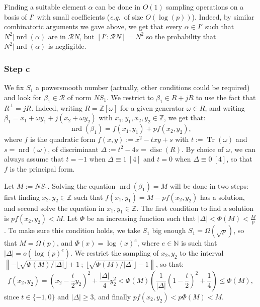 \documentclass[a4paper,10pt,notitlepage]{report}
\theoremstyle{definition}
\theoremstyle{plain}
\theoremstyle{definition}
\newcommand{\eg}{\emph{e.g.}\ }
\newcommand{\N}{\mathbb{N}}
\newcommand{\Z}{\mathbb{Z}}
\newcommand{\m}[1]{\mathcal{#1}}
\renewcommand{\i}[2]{\left\llbracket #1~;~#2\right\rrbracket}
\renewcommand{\(}{\left(}
\renewcommand{\)}{\right)}
\DeclareMathOperator{\Tr}{Tr}
\DeclareMathOperator{\disc}{disc}
\DeclareMathOperator{\nrd}{nrd}
\begin{document}
Finding a suitable element $\alpha$ can be done in $O(1)$ sampling operations on a basis of $I'$ with small coefficients (\eg of size $O(\log(p))$).  Indeed, by similar combinatoric arguments we gave above, we get that every $\alpha\in I'$ such that $N^2|\nrd(\alpha)$ are in $\m{R}N$, but $[I':\m{R}N]=N^2$ so the probability that $N^2|\nrd(\alpha)$ is negligible.

\subsubsection{Step c}

We fix $S_1$ a powersmooth number (actually,  other conditions could be required) and look for $\beta_1\in\m{R}$ of norm $NS_1$. We restrict to $\beta_1\in R+jR$ to use the fact that $R^\bot=jR$.  Indeed, writing $R=\Z[\omega]$ for a given generator $\omega\in R$, and writing $\beta_1=x_1+\omega y_1+j(x_2+\omega y_2)$ with $x_1, y_1, x_2, y_2\in\Z$, we get that:
\[\nrd(\beta_1)=f(x_1,y_1)+pf(x_2,y_2),\]
where $f$ is the quadratic form $f(x,y):=x^2-t xy+s$ with $t:=\Tr(\omega)$ and $s=\nrd(\omega)$, of discriminant $\Delta:=t^2-4s=\disc(R)$.  By choice of $\omega$, we can always assume that $t=-1$ when $\Delta\equiv 1 \ [4]$ and $t=0$ when $\Delta\equiv 0 \ [4]$, so that $f$ is the principal form.  

Let $M:=NS_1$. Solving the equation $\nrd(\beta_1)=M$ will be done in two steps: first finding $x_2,y_2\in\Z$ such that $f(x_1,y_1)=M-pf(x_2,y_2)$ has a solution, and second solve the equation in $x_1,y_1\in\Z$.  The first condition to find a solution is $pf(x_2,y_2)<M$. Let $\Phi$ be an increasing function such that $|\Delta|<\Phi(M)<\frac{M}{p}$. To make sure this condition holds, we take $S_1$ big enough $S_1=\Omega(\sqrt{p})$, so that $M=\Omega(p)$, and $\Phi(x)=\log(x)^e$, where $e\in\N$ is such that $|\Delta|=o(\log(p)^e)$.  We restrict the sampling of $x_2, y_2$ to the interval $\i{-\lfloor\sqrt{\Phi(M)/|\Delta|}\rfloor+1}{\lfloor\sqrt{\Phi(M)/|\Delta|}\rfloor-1}$, so that:
\[f(x_2,y_2)=\(x_2-\frac{t}{2}y_2\)^2+\frac{|\Delta|}{4}y_2^2<\Phi(M)\(\frac{1}{|\Delta|}\(1-\frac{t}{2}\)^2+\frac{1}{4}\)\leq \Phi(M),\]
since $t\in\{-1,0\}$ and $|\Delta|\geq 3$, and finally $pf(x_2,y_2)<p\Phi(M)<M$. 
\end{document}
